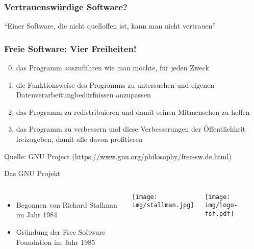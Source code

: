 \begin{frame}
    \frametitle{Vertrauenswürdige Software?}
    \begin{center}\Large
        \enquote{Einer Software, die nicht quelloffen ist, kann man nicht vertrauen}
    \end{center}
\end{frame}

\begin{frame}
	\frametitle{Freie Software: Vier Freiheiten!}

	\begin{enumerate}
		\setcounter{enumi}{-1}
		\item das Programm auszuführen wie man möchte, für jeden Zweck
		\item die Funktionsweise des Programms zu untersuchen und eigenen Datenverarbeitungbedürfnissen anzupassen 
		\item das Programm zu redistribuieren und damit seinen Mitmenschen zu helfen
		\item das Programm zu verbessern und diese Verbesserungen der Öffentlichkeit freizugeben, damit alle davon profitieren
	\end{enumerate}
	
	Quelle: GNU Project (\url{https://www.gnu.org/philosophy/free-sw.de.html})
\end{frame}

\begin{frame}{Das GNU Projekt}
  \begin{columns}
    \column{6cm}

    \begin{itemize}
      \item Begonnen von Richard Stallman im Jahr 1984 
      \item Gründung der Free Software Foundation im Jahr 1985 
    \end{itemize}

    \column{7cm}

    \begin{center}
      \texttt{[image: img/stallman.jpg]}
    \par\end{center}

    \begin{center}
      \texttt{[image: img/logo-fsf.pdf]}
    \par\end{center}
  \end{columns}
\end{frame}

